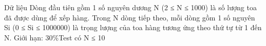 Dữ liệu
Dòng đầu tiên gồm 1 số nguyên dương N (2 ≤ N ≤ 1000) là số lượng toa đã được dùng để xếp hàng.  Trong N dòng tiếp theo, mỗi dòng gồm 1 số nguyên Si (0 ≤ Si ≤ 1000000) là trọng lượng của toa hàng tương ứng theo thứ tự từ 1 đến N.    Giới hạn: 30\%Test có N ≤ 10